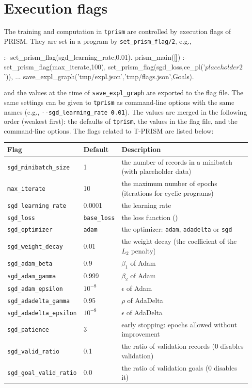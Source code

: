 \documentclass[a4paper]{report}
\begin{document}
\section{Execution flags}
\label{sec:flags}

The training and computation in {\tt tprism} are controlled by execution
flags of PRISM.  They are set in a program by {\tt set\_prism\_flag/2}, e.g.,
\begin{prologcode}
:- set_prism_flag(sgd_learning_rate,0.01).
prism_main([]) :-
    set_prism_flag(max_iterate,100),
    set_prism_flag(sgd_loss,ce_pl('$placeholder2$')),
    ...
    save_expl_graph('tmp/expl.json','tmp/flags.json',Goals).
\end{prologcode}
and the values at the time of {\tt save\_expl\_graph} are exported to the
flag file.  The same settings can be given to {\tt tprism} as
command-line options with the same names (e.g., {\tt -{}-sgd\_learning\_rate
	0.01}).  The values are merged in the following order (weakest first): the
defaults of {\tt tprism}, the values in the flag file, and the
command-line options.  The flags related to T-PRISM are listed below:
\begin{center}
	\small
	\begin{tabular}{lll}
		\toprule
		Flag & Default & Description \\
		\midrule
		{\tt sgd\_minibatch\_size} & 1 & the number of records in a minibatch (with placeholder data) \\
		{\tt max\_iterate} & 10 & the maximum number of epochs (iterations for cyclic programs) \\
		{\tt sgd\_learning\_rate} & 0.0001 & the learning rate \\
		{\tt sgd\_loss} & {\tt base\_loss} & the loss function (\prettyref{sec:specify_loss}) \\
		{\tt sgd\_optimizer} & {\tt adam} & the optimizer: {\tt adam}, {\tt adadelta} or {\tt sgd} \\
		{\tt sgd\_weight\_decay} & 0.01 & the weight decay (the coefficient of the $L_2$ penalty) \\
		{\tt sgd\_adam\_beta} & 0.9 & $\beta_1$ of Adam \\
		{\tt sgd\_adam\_gamma} & 0.999 & $\beta_2$ of Adam \\
		{\tt sgd\_adam\_epsilon} & $10^{-8}$ & $\epsilon$ of Adam \\
		{\tt sgd\_adadelta\_gamma} & 0.95 & $\rho$ of AdaDelta \\
		{\tt sgd\_adadelta\_epsilon} & $10^{-8}$ & $\epsilon$ of AdaDelta \\
		{\tt sgd\_patience} & 3 & early stopping: epochs allowed without improvement \\
		{\tt sgd\_valid\_ratio} & 0.1 & the ratio of validation records (0 disables validation) \\
		{\tt sgd\_goal\_valid\_ratio} & 0.0 & the ratio of validation goals (0 disables it) \\
		\bottomrule
	\end{tabular}
\end{center}
\end{document}
